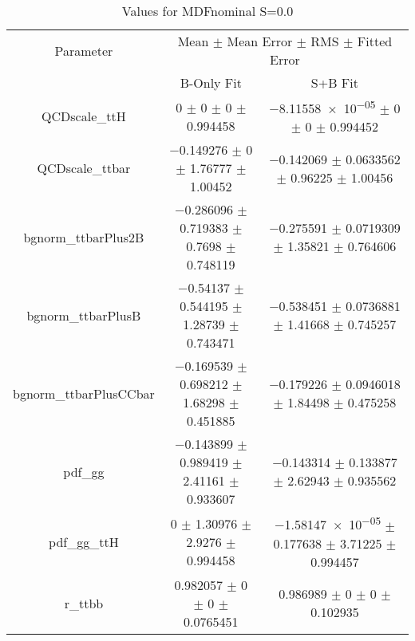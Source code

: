 \begin{table}
\centering
\caption{Values for MDFnominal S=0.0}
\begin{tabular}{ccc}
\toprule
Parameter & \multicolumn{2}{c}{Mean $\pm$ Mean Error $\pm$ RMS $\pm$ Fitted Error}\\
 & B-Only Fit & S+B Fit\\
\midrule
QCDscale\_ttH & \num{0} $\pm$ \num{0} $\pm$ \num{0} $\pm$ \num{0.994458} & \num{-8.11558e-05} $\pm$ \num{0} $\pm$ \num{0} $\pm$ \num{0.994452}\\
QCDscale\_ttbar & \num{-0.149276} $\pm$ \num{0} $\pm$ \num{1.76777} $\pm$ \num{1.00452} & \num{-0.142069} $\pm$ \num{0.0633562} $\pm$ \num{0.96225} $\pm$ \num{1.00456}\\
bgnorm\_ttbarPlus2B & \num{-0.286096} $\pm$ \num{0.719383} $\pm$ \num{0.7698} $\pm$ \num{0.748119} & \num{-0.275591} $\pm$ \num{0.0719309} $\pm$ \num{1.35821} $\pm$ \num{0.764606}\\
bgnorm\_ttbarPlusB & \num{-0.54137} $\pm$ \num{0.544195} $\pm$ \num{1.28739} $\pm$ \num{0.743471} & \num{-0.538451} $\pm$ \num{0.0736881} $\pm$ \num{1.41668} $\pm$ \num{0.745257}\\
bgnorm\_ttbarPlusCCbar & \num{-0.169539} $\pm$ \num{0.698212} $\pm$ \num{1.68298} $\pm$ \num{0.451885} & \num{-0.179226} $\pm$ \num{0.0946018} $\pm$ \num{1.84498} $\pm$ \num{0.475258}\\
pdf\_gg & \num{-0.143899} $\pm$ \num{0.989419} $\pm$ \num{2.41161} $\pm$ \num{0.933607} & \num{-0.143314} $\pm$ \num{0.133877} $\pm$ \num{2.62943} $\pm$ \num{0.935562}\\
pdf\_gg\_ttH & \num{0} $\pm$ \num{1.30976} $\pm$ \num{2.9276} $\pm$ \num{0.994458} & \num{-1.58147e-05} $\pm$ \num{0.177638} $\pm$ \num{3.71225} $\pm$ \num{0.994457}\\
r\_ttbb & \num{0.982057} $\pm$ \num{0} $\pm$ \num{0} $\pm$ \num{0.0765451} & \num{0.986989} $\pm$ \num{0} $\pm$ \num{0} $\pm$ \num{0.102935}\\
\bottomrule
\end{tabular}
\end{table}